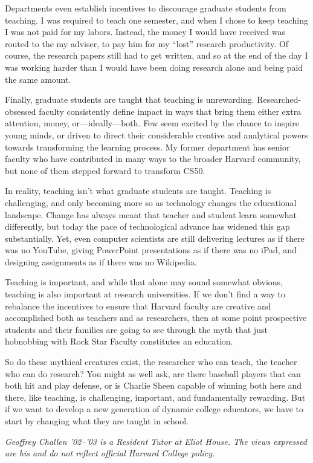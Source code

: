Departments even establish incentives to discourage graduate students from
teaching. I was required to teach one semester, and when I chose to keep
teaching I was not paid for my labors. Instead, the money I would have
received was routed to the my adviser, to pay him for my ``lost'' research
productivity. Of course, the research papers still had to get written, and so
at the end of the day I was working harder than I would have been doing
research alone and being paid the same amount.

Finally, graduate students are taught that teaching is unrewarding.
Researched-obsessed faculty consistently define impact in ways that bring
them either extra attention, money, or---ideally---both. Few seem excited by
the chance to inspire young minds, or driven to direct their considerable
creative and analytical powers towards transforming the learning process. My
former department has senior faculty who have contributed in many ways to the
broader Harvard community, but none of them stepped forward to transform
CS50.

In reality, teaching isn't what graduate students are taught. Teaching is
challenging, and only becoming more so as technology changes the educational
landscape. Change has always meant that teacher and student learn somewhat
differently, but today the pace of technological advance has widened this gap
substantially. Yet, even computer scientists are still delivering lectures as
if there was no YouTube, giving PowerPoint presentations as if there was no
iPad, and designing assignments as if there was no Wikipedia.

Teaching is important, and while that alone may sound somewhat obvious,
teaching is also important at research universities. If we don't find a way
to rebalance the incentives to ensure that Harvard faculty are creative and
accomplished both as teachers and as researchers, then at some point
prospective students and their families are going to see through the myth
that just hobnobbing with Rock Star Faculty constitutes an education.

So do these mythical creatures exist, the researcher who can teach, the
teacher who can do research? You might as well ask, are there baseball
players that can both hit and play defense, or is Charlie Sheen capable of
winning both here and there, like teaching, is challenging, important, and
fundamentally rewarding. But if we want to develop a new generation of
dynamic college educators, we have to start by changing what they are taught
in school.


\textit{Geoffrey Challen '02--'03 is a Resident Tutor at Eliot House. The
views expressed are his and do not reflect official Harvard College policy.}

